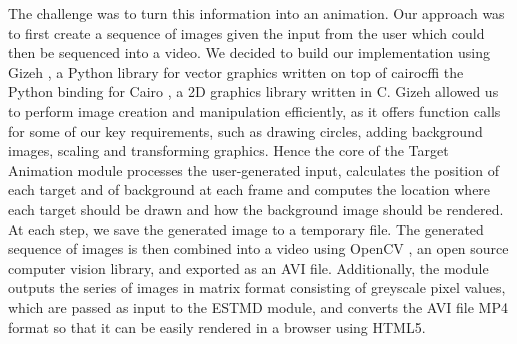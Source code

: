 \documentclass[a4paper,11pt]{article}
\begin{document}
The challenge was to turn this information into an animation. Our approach was to first create a sequence of images given the input from the user which could then be sequenced into a video. We decided to build our implementation using Gizeh \cite{gizeh}, a Python library for vector graphics written on top of cairocffi \cite{cairocffi} the Python binding for Cairo \cite{cairo}, a 2D graphics library written in C. Gizeh allowed us to perform image creation and manipulation efficiently, as it offers function calls for some of our key requirements, such as drawing circles, adding background images, scaling and transforming graphics. Hence the core of the Target Animation module processes the user-generated input, calculates the position of each target and of background at each frame and computes the location where each target should be drawn and how the background image should be rendered. At each step, we save the generated image to a temporary file. The generated sequence of images is then combined into a video using OpenCV \cite{opencv}, an open source computer vision library, and exported as an AVI file. Additionally, the module outputs the series of images in matrix format consisting of greyscale pixel values, which are passed as input to the ESTMD module, and converts the AVI file MP4 format so that it can be easily rendered in a browser using HTML5.
\end{document}
